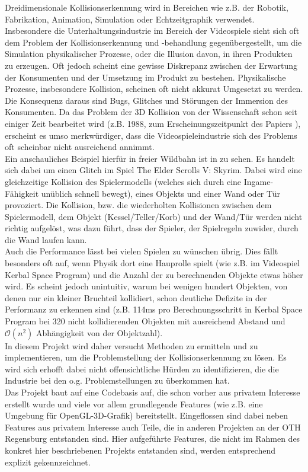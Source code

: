 
Dreidimensionale Kollisionserkennung wird in Bereichen wie z.B. der Robotik, Fabrikation, Animation, Simulation oder Echtzeitgraphik verwendet.
Insbesondere die Unterhaltungsindustrie im Bereich der Videospiele sieht sich oft dem Problem der Kollisionserkennung und -behandlung gegenübergestellt, um die Simulation physikalischer Prozesse, oder die Illusion davon, in ihren Produkten zu erzeugen.
Oft jedoch scheint eine gewisse Diskrepanz zwischen der Erwartung der Konsumenten und der Umsetzung im Produkt zu bestehen. Physikalische Prozesse, insbesondere Kollision, scheinen oft nicht akkurat Umgesetzt zu werden. Die Konsequenz daraus sind Bugs, Glitches und Störungen der Immersion des Konsumenten.
Da das Problem der 3D Kollision von der Wissenschaft schon seit einiger Zeit bearbeitet wird (z.B. 1988, zum Erscheinungszeitpunkt des Papiers \cite{gjk}), erscheint es umso merkwürdiger, dass die Videospieleindustrie sich des Problems oft scheinbar nicht ausreichend annimmt.\\
Ein anschauliches Beispiel hierfür in freier Wildbahn ist in \cite{skyrimwallglitch} zu sehen. Es handelt sich dabei um einen Glitch im Spiel The Elder Scrolls V: Skyrim. Dabei wird eine gleichzeitige Kollision des Spielermodells (welches sich durch eine Ingame-Fähigkeit unüblich schnell bewegt), eines Objekts und einer Wand oder Tür provoziert. Die Kollision, bzw. die wiederholten Kollisionen zwischen dem Spielermodell, dem Objekt (Kessel/Teller/Korb) und der Wand/Tür werden nicht richtig aufgelöst, was dazu führt, dass der Spieler, der Spielregeln zuwider, durch die Wand laufen kann.\\
Auch die Performance lässt bei vielen Spielen zu wünschen übrig. Dies fällt besonders oft auf, wenn Physik dort eine Hauprolle spielt (wie z.B. im Videospiel Kerbal Space Program) und die Anzahl der zu berechnenden Objekte etwas höher wird. Es scheint jedoch unintuitiv, warum bei wenigen hundert Objekten, von denen nur ein kleiner Bruchteil kollidiert, schon deutliche Defizite in der Performanz zu erkennen sind (z.B. 114ms pro Berechnungsschritt in Kerbal Space Program bei 320 nicht kollidierenden Objekten mit ausreichend Abstand und $\mathcal{O}(n^2)$ Abhängigkeit von der Objektzahl).\\
In diesem Projekt wird daher versucht Methoden zu ermitteln und zu implementieren, um die Problemstellung der Kollisionserkennung zu lösen. Es wird sich erhofft dabei nicht offensichtliche Hürden zu identifizieren, die die Industrie bei den o.g. Problemstellungen zu überkommen hat. \\
Das Projekt baut auf eine Codebasis auf, die schon vorher aus privatem Interesse erstellt wurde und viele vor allem grundlegende Features (wie z.B. eine Umgebung für OpenGL-3D-Grafik) bereitstellt. Eingeflossen sind dabei neben Features aus privatem Interesse auch Teile, die in anderen Projekten an der OTH Regensburg entstanden sind. Hier aufgeführte Features, die nicht im Rahmen des konkret hier beschriebenen Projekts entstanden sind, werden entsprechend explizit gekennzeichnet.